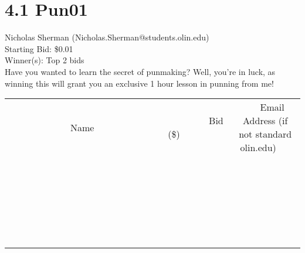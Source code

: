 \documentclass[11pt]{article}
\begin{document}
\section*{4.1 Pun01}
Nicholas Sherman (Nicholas.Sherman@students.olin.edu) \\
Starting Bid: \$0.01 \\
Winner(s): 
Top 2 bids \\
Have you wanted to learn the secret of punmaking? Well, you're in luck, as winning this will grant you an exclusive 1 hour lesson in punning from me! \\[6ex]
\begin{tabular}{c c c}
~~~~~~~~~~~~~Name~~~~~~~~~~~~~ & ~~~~~~~~~Bid (\$)~~~~~~~~~ & ~~~Email Address (if not standard olin.edu)~~~ \\
 & & \\
\hline
 & & \\
\hline
 & & \\
\hline
 & & \\
\hline
 & & \\
\hline
 & & \\
\hline
 & & \\
\hline
 & & \\
\hline
 & & \\
\hline
 & & \\
\hline
 & & \\
\hline
 & & \\
\hline
 & & \\
\hline
 & & \\
\hline
 & & \\
\hline
 & & \\
\hline
 & & \\
\hline
 & & \\
\hline
 & & \\
\hline
 & & \\
\hline
 & & \\
\hline
 & & \\
\hline
 & & \\
\hline
 & & \\
\hline
 & & \\
\hline
 & & \\
\hline
\end{tabular}
\clearpage
\end{document}
